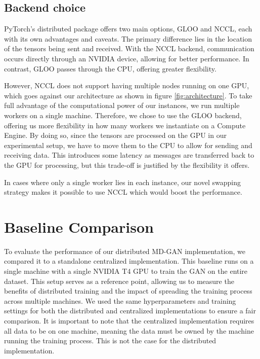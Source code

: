 \subsection{Backend choice}
PyTorch's distributed package offers two main options, GLOO and NCCL, each with its own advantages and caveats. The primary difference lies in the location of the tensors being sent and received. With the NCCL backend, communication occurs directly through an NVIDIA device, allowing for better performance. In contrast, GLOO passes through the CPU, offering greater flexibility.

However, NCCL does not support having multiple nodes running on one GPU, which goes against our architecture as shown in figure \ref{fig:architecture}. To take full advantage of the computational power of our instances, we run multiple workers on a single machine. Therefore, we chose to use the GLOO backend, offering us more flexibility in how many workers we instantiate on a Compute Engine. By doing so, since the tensors are processed on the GPU in our experimental setup, we have to move them to the CPU to allow for sending and receiving data. This introduces some latency as messages are transferred back to the GPU for processing, but this trade-off is justified by the flexibility it offers.

In cases where only a single worker lies in each instance, our novel swapping strategy makes it possible to use NCCL which would boost the performance.



\section{Baseline Comparison}
To evaluate the performance of our distributed MD-GAN implementation, we compared it to a standalone centralized implementation. This baseline runs on a single machine with a single NVIDIA T4 GPU to train the GAN on the entire dataset. This setup serves as a reference point, allowing us to measure the benefits of distributed training and the impact of spreading the training process across multiple machines. We used the same hyperparameters and training settings for both the distributed and centralized implementations to ensure a fair comparison. It is important to note that the centralized implementation requires all data to be on one machine, meaning the data must be owned by the machine running the training process. This is not the case for the distributed implementation.

